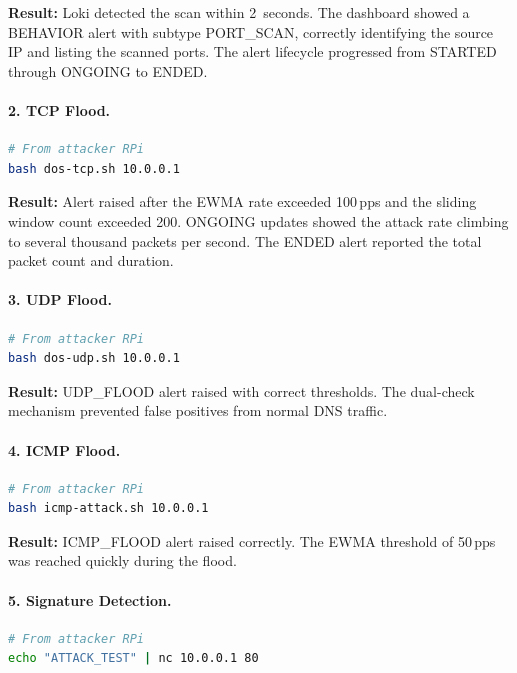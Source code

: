 \documentclass[12pt,a4paper]{article}
\begin{document}
\textbf{Result:} Loki detected the scan within 2~seconds. The dashboard showed a BEHAVIOR alert with subtype PORT\_SCAN, correctly identifying the source IP and listing the scanned ports. The alert lifecycle progressed from STARTED through ONGOING to ENDED.

\paragraph{2. TCP Flood.}

\begin{lstlisting}[language=bash]
# From attacker RPi
bash dos-tcp.sh 10.0.0.1
\end{lstlisting}

\textbf{Result:} Alert raised after the EWMA rate exceeded 100\,pps and the sliding window count exceeded 200. ONGOING updates showed the attack rate climbing to several thousand packets per second. The ENDED alert reported the total packet count and duration.

\paragraph{3. UDP Flood.}

\begin{lstlisting}[language=bash]
# From attacker RPi
bash dos-udp.sh 10.0.0.1
\end{lstlisting}

\textbf{Result:} UDP\_FLOOD alert raised with correct thresholds. The dual-check mechanism prevented false positives from normal DNS traffic.

\paragraph{4. ICMP Flood.}

\begin{lstlisting}[language=bash]
# From attacker RPi
bash icmp-attack.sh 10.0.0.1
\end{lstlisting}

\textbf{Result:} ICMP\_FLOOD alert raised correctly. The EWMA threshold of 50\,pps was reached quickly during the flood.

\paragraph{5. Signature Detection.}

\begin{lstlisting}[language=bash]
# From attacker RPi
echo "ATTACK_TEST" | nc 10.0.0.1 80
\end{lstlisting}
\end{document}
